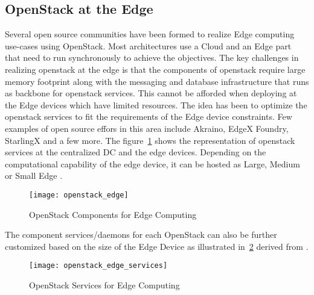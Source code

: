 \subsection{OpenStack at the Edge}

Several open source communities have been formed to realize Edge computing use-cases using OpenStack. Most architectures use a Cloud and an Edge part that need to run synchronously to achieve the objectives. The key challenges in realizing openstack at the edge is that the components of openstack require large memory footprint along with the messaging and database infrastructure that runs as backbone for openstack services. This cannot be afforded when deploying at the Edge devices which have limited resources. The idea has been to optimize the openstack services to fit the requirements of the Edge device constraints. Few examples of open source effors in this area include Akraino, EdgeX Foundry, StarlingX and a few more. The figure~\ref{fig:figure13} shows the representation of openstack services at the centralized DC and the edge devices. Depending on the computational capability of the edge device, it can be hosted as Large, Medium or Small Edge \cite{osedge}.

\begin{figure}[h!]
    \centering
    \texttt{[image: openstack\_edge]}
    \label{fig:figure13}
    \caption{OpenStack Components for Edge Computing}
\end{figure}

The component services/daemons for each OpenStack can also be further customized based on the size of the Edge Device as illustrated in~\ref{fig:figure14} derived from \cite{osedge}.

\begin{figure}[h!]
    \centering
    \texttt{[image: openstack\_edge\_services]}
    \label{fig:figure14}
    \caption{OpenStack Services for Edge Computing}
\end{figure}


